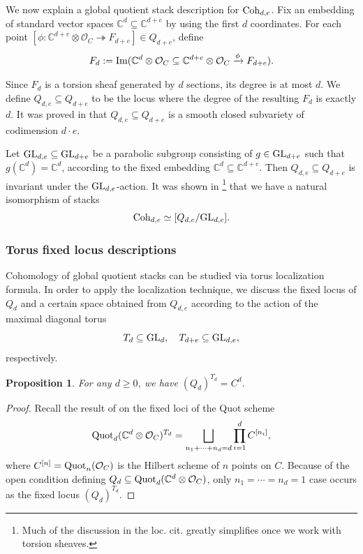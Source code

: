 \documentclass[10pt]{amsart}
\newcommand{\BC}{\mathbb{C}}
\newcommand{\CO}{\mathcal{O}}
\newcommand{\Quot}{\textnormal{Quot}}
\newcommand{\Coh}{\textnormal{Coh}}
\newcommand{\+}{{}^+}
\newcommand{\GL}{\textnormal{GL}}
\newtheorem {proposition}[theorem]{Proposition}
\theoremstyle{definition}
\theoremstyle {definition}
\theoremstyle {definition}
\begin{document}
We now explain a global quotient stack description for $\Coh_{d,e}$. Fix an embedding of standard vector spaces $\BC^d\subseteq \BC^{d+e}$ by using the first $d$ coordinates.  For each point $[\phi:\BC^{d+e}\otimes \CO_C\twoheadrightarrow F_{d+e}]\in Q_{d+e}$, define
\begin{align}\label{subquotient}
F_d:=\textnormal{Im}(\BC^d\otimes\CO_C\subseteq \BC^{d+e}\otimes \CO_C\xrightarrow{\phi}F_{d+e}).
\end{align} 

Since $F_d$ is a torsion sheaf generated by $d$ sections, its degree is at most $d$. We define $Q_{d,e}\subseteq Q_{d+e}$ to be the locus where the degree of the resulting $F_d$ is exactly $d$. It was proved in \cite[Prop. 1.8]{Minets} that $Q_{d,e}\subseteq Q_{d+e}$ is a smooth closed subvariety of codimension $d\cdot e$. 

Let $\GL_{d,e}\subseteq \GL_{d+e}$ be a parabolic subgroup consisting of $g\in \GL_{d+e}$ such that $g(\BC^d)=\BC^d$, according to the fixed embedding $\BC^d\subseteq \BC^{d+e}$. Then $Q_{d,e}\subseteq Q_{d+e}$ is invariant under the $\GL_{d,e}$-action. It was shown in \cite[Sec. 3.2.1]{Sala-Schiffmann}\footnote{Much of the discussion in the loc. cit. greatly simplifies once we work with torsion sheaves. } that we have a natural isomorphism of stacks
\begin{equation}\label{eq: quotient description for Coh_d,e}
\Coh_{d,e}\simeq[Q_{d,e}/\GL_{d,e}]. 
\end{equation}








\subsubsection{Torus fixed locus descriptions}  Cohomology of global quotient stacks can be studied via torus localization formula. In order to apply the localization technique, we discuss the fixed locus of $Q_d$ and a certain space obtained from $Q_{d,e}$ according to the action of the maximal diagonal torus $$T_d\subseteq \GL_{d},\quad T_{d+e}\subseteq\GL_{d,e},$$ 
respectively.

\begin{proposition}\label{prop: fixed locus of Q_d}
    For any $d\geq 0$, we have $(Q_d)^{T_d}=C^d$. 
\end{proposition}
\begin{proof}
    Recall the result of \cite{Bifet} on the fixed loci of the Quot scheme
$$\Quot_d(\BC^d\otimes\CO_C)^{T_d}=\bigsqcup_{n_1+\dots+n_d=d} \prod_{i=1}^dC^{[n_i]},
$$
where $C^{[n]}=\Quot_n(\CO_C)$ is the Hilbert scheme of $n$ points on $C$. Because of the open condition defining $Q_d\subseteq \Quot_d(\BC^d\otimes\CO_C)$, only $n_1=\cdots=n_d=1$ case occurs as the fixed locus $(Q_d)^{T_d}$.
\end{proof}
\end{document}
